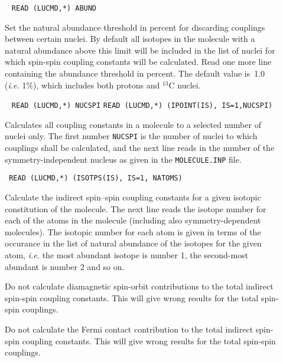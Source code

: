 \begin{description}
\item[]\verb| |\newline
\verb|READ (LUCMD,*) ABUND|

Set the natural abundance threshold in percent
for discarding couplings between certain nuclei.
By default all isotopes in the molecule with a natural
abundance above this limit will be included in the list of nuclei for which
spin-spin coupling constants will be calculated. Read one more line
containing the abundance threshold in percent. The default value is~1.0 ({\it i.e.\/} 1\%),
which includes both protons and $^{13}$C nuclei.

\item[]\verb| |\newline
\verb|READ (LUCMD,*) NUCSPI|\newline
\verb|READ (LUCMD,*) (IPOINT(IS), IS=1,NUCSPI)|

Calculates all coupling constants in a molecule to a selected number
of nuclei only. The first number \verb|NUCSPI| is the number of nuclei
to which couplings shall be calculated, and the next line reads in
the number of the symmetry-independent nucleus as given in the
\verb|MOLECULE.INP| file.

\item[]\verb| |\newline
\verb|READ (LUCMD,*) (ISOTPS(IS), IS=1, NATOMS)|

Calculate the indirect spin--spin coupling constants for a given
isotopic constitution of the molecule. The next line reads the isotope
number for each of the atoms in the molecule (including also
symmetry-dependent molecules). The isotopic number for each atom is
given in terms of the occurance in the list of natural abundance of
the isotopes for the given atom, {\it i.e.\/} the most abundant
isotope is number 1, the second-most abundant is number 2 and so on.

\item[] Do not calculate diamagnetic
spin-orbit
contributions to the total indirect spin-spin 
coupling constants. This 
will give wrong results for the total spin-spin couplings.

\item[] Do not calculate the Fermi
contact contribution 
to the total indirect spin-spin coupling
constants. This will give 
wrong results for the total spin-spin couplings.


\end{description}
